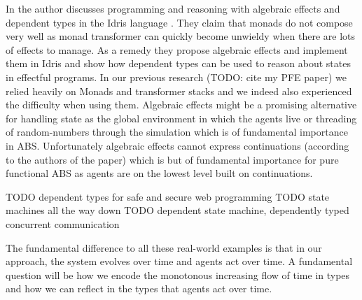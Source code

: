 In \cite{brady_programming_2013} the author discusses programming and reasoning with algebraic effects and dependent types in the Idris language \cite{brady_idris_2013}. They claim that monads do not compose very well as monad transformer can quickly become unwieldy when there are lots of effects to manage. As a remedy they propose algebraic effects and implement them in Idris and show how dependent types can be used to reason about states in effectful programs. In our previous research (TODO: cite my PFE paper) we relied heavily on Monads and transformer stacks and we indeed also experienced the difficulty when using them. Algebraic effects might be a promising alternative for handling state as the global environment in which the agents live or threading of random-numbers through the simulation which is of fundamental importance in ABS. Unfortunately algebraic effects cannot express continuations (according to the authors of the paper) which is but of fundamental importance for pure functional ABS as agents are on the lowest level built on continuations. 

TODO \cite{fowler_dependent_2014} dependent types for safe and secure web programming
TODO \cite{brady_state_2016} state machines all the way down
TODO \cite{brady_type-driven_2017} dependent state machine, dependently typed concurrent communication

The fundamental difference to all these real-world examples is that in our approach, the system evolves over time and agents act over time. A fundamental question will be how we encode the monotonous increasing flow of time in types and how we can reflect in the types that agents act over time.


